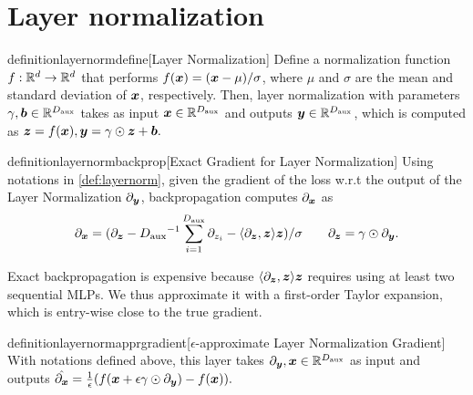 \section{Layer normalization}\label{sec:LNappendix}



\begin{restatable}{definition}{layernormdefine}[Layer Normalization]\label{def:layernorm}
Define a normalization function $f:\mathbb{R}^d\to\mathbb{R}^d$ that performs $f({\bm{x}}) = ({\bm{x}}-\mu) / \sigma$, where $\mu$ and $\sigma$ are the mean and standard deviation of ${\bm{x}}$, respectively.
	Then, layer normalization with parameters $\mathbf{\gamma}, {\bm{b}} \in \mathbb{R}^{D_{\text{aux}}}$ takes as input  ${\bm{x}} \in \mathbb{R}^{D_{\text{aux}}}$ and outputs ${\bm{y}}\in\mathbb{R}^{D_{\text{aux}}}$, which is computed as ${\bm{z}} = f({\bm{x}}), {\bm{y}} = \mathbf{\gamma} \odot {\bm{z}} + {\bm{b}}.$
\end{restatable}
\begin{restatable}{definition}{layernormbackprop}[Exact Gradient for Layer Normalization]\label{def:layernorm_backprop}
	Using notations in \cref{def:layernorm}, given the gradient of the loss w.r.t the output of the Layer Normalization $\partial_{{\bm{y}}}$, backpropagation computes $\partial_{{\bm{x}}}$	as
	\begin{align*}
	    \partial_{{\bm{x}}} = ( \partial_{{\bm{z}}} -  {D_{\text{aux}}}^{-1} 
 \sum_{i=1}^{ D_{\text{aux}} } \partial_{z_i} -  \langle \partial_{{\bm{z}}}, {\bm{z}} \rangle {\bm{z}} ) / \sigma \qquad \partial_{{\bm{z}}} = \mathbf{\gamma} \odot \partial_{{\bm{y}}}.
	\end{align*} 
\end{restatable}
 Exact backpropagation is expensive because $\langle \partial_{ {\bm{z}} }, {\bm{z}} \rangle {\bm{z}}$ requires using at least two sequential MLPs. We thus approximate it with a first-order Taylor expansion, which is entry-wise close to the true gradient.
\begin{restatable}{definition}{layernormapprgradient}[$\epsilon$-approximate Layer Normalization Gradient]\label{def:layernorm_appr_backprop}
     With notations defined above, this layer takes $\partial_{ {\bm{y}} }, {\bm{x}} \in\mathbb{R}^{D_{\text{aux}}}$ as input and outputs
   $\Hat{ \partial_{ {\bm{x}} } } = \frac{1}{\epsilon} ( f({\bm{x}} + \epsilon \gamma \odot \partial_{ {\bm{y}} } ) - f({\bm{x}}) ).$
\end{restatable}

